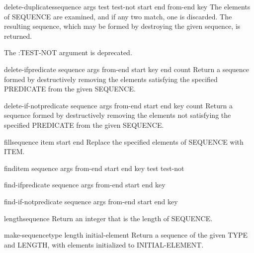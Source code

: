 \begin{function}{delete-duplicates}{sequence \rest args \key test test-not start end from-end key}{}{}
  The elements of SEQUENCE are examined, and if any two match, one is
   discarded. The resulting sequence, which may be formed by destroying the
   given sequence, is returned.

   The :TEST-NOT argument is deprecated.
\end{function}

\begin{function}{delete-if}{predicate sequence \rest args \key from-end start key end count}{}{}
  Return a sequence formed by destructively removing the elements satisfying
  the specified PREDICATE from the given SEQUENCE.
\end{function}

\begin{function}{delete-if-not}{predicate sequence \rest args \key from-end start end key count}{}{}
  Return a sequence formed by destructively removing the elements not
  satisfying the specified PREDICATE from the given SEQUENCE.
\end{function}

\begin{function}{fill}{sequence item \key start end}{}{}
  Replace the specified elements of SEQUENCE with ITEM.
\end{function}

\begin{function}{find}{item sequence \rest args \key from-end start end key test test-not}{}{}
  
\end{function}

\begin{function}{find-if}{predicate sequence \rest args \key from-end start end key}{}{}
  
\end{function}

\begin{function}{find-if-not}{predicate sequence \rest args \key from-end start end key}{}{}
  
\end{function}

\begin{function}{length}{sequence}{}{}
  Return an integer that is the length of SEQUENCE.
\end{function}

\begin{function}{make-sequence}{type length \key initial-element}{}{}
  Return a sequence of the given TYPE and LENGTH, with elements initialized
  to INITIAL-ELEMENT.
\end{function}


